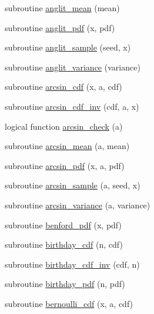 \begin{DoxyCompactItemize}
\item 
subroutine \hyperlink{_bhabha__fortran__sem__doxy_8f_aedd5857199140786c9bc4b031062c55e}{anglit\+\_\+mean} (mean)
\item 
subroutine \hyperlink{_bhabha__fortran__sem__doxy_8f_a6ac310db648e48aed924a16a04c1ba4e}{anglit\+\_\+pdf} (x, pdf)
\item 
subroutine \hyperlink{_bhabha__fortran__sem__doxy_8f_ad8650a8f15bfee60252281a20c85516e}{anglit\+\_\+sample} (seed, x)
\item 
subroutine \hyperlink{_bhabha__fortran__sem__doxy_8f_a4e147e31b56df3c9c2751b91de61ba28}{anglit\+\_\+variance} (variance)
\item 
subroutine \hyperlink{_bhabha__fortran__sem__doxy_8f_ad1ea95ee407eec1875a81feb0d44d6e1}{arcsin\+\_\+cdf} (x, a, cdf)
\item 
subroutine \hyperlink{_bhabha__fortran__sem__doxy_8f_aeba9ed4e4b270a2c19780190aaaed016}{arcsin\+\_\+cdf\+\_\+inv} (cdf, a, x)
\item 
logical function \hyperlink{_bhabha__fortran__sem__doxy_8f_a6106c25a912dbdfd3a3016548132640e}{arcsin\+\_\+check} (a)
\item 
subroutine \hyperlink{_bhabha__fortran__sem__doxy_8f_a0f3f6a9d53c5ee489f35b5aedd71c3e9}{arcsin\+\_\+mean} (a, mean)
\item 
subroutine \hyperlink{_bhabha__fortran__sem__doxy_8f_a370461195a0a6dbc81d1694f1c900521}{arcsin\+\_\+pdf} (x, a, pdf)
\item 
subroutine \hyperlink{_bhabha__fortran__sem__doxy_8f_af45217dbb90ff9bd690d7d87061616a9}{arcsin\+\_\+sample} (a, seed, x)
\item 
subroutine \hyperlink{_bhabha__fortran__sem__doxy_8f_aec7db221e74872bf1e854e0bd9bab771}{arcsin\+\_\+variance} (a, variance)
\item 
subroutine \hyperlink{_bhabha__fortran__sem__doxy_8f_a9fef702e6bf364a5f85533ca613a7d94}{benford\+\_\+pdf} (x, pdf)
\item 
subroutine \hyperlink{_bhabha__fortran__sem__doxy_8f_a2ef757fb4d120a7339e7ba2d6e4df537}{birthday\+\_\+cdf} (n, cdf)
\item 
subroutine \hyperlink{_bhabha__fortran__sem__doxy_8f_a8688523c630741866353afc455c7a5ee}{birthday\+\_\+cdf\+\_\+inv} (cdf, n)
\item 
subroutine \hyperlink{_bhabha__fortran__sem__doxy_8f_acae6886b34ec452abc19475c7905366b}{birthday\+\_\+pdf} (n, pdf)
\item 
subroutine \hyperlink{_bhabha__fortran__sem__doxy_8f_ab0c099a6932ebc7e4d4378e2bcebfb6a}{bernoulli\+\_\+cdf} (x, a, cdf)

\end{DoxyCompactItemize}
